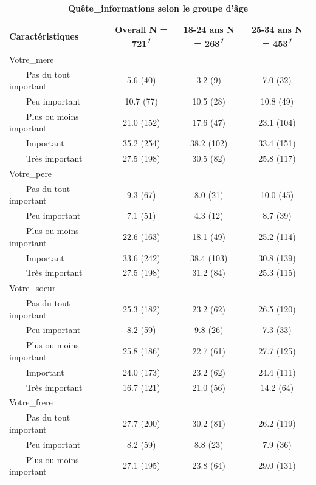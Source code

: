 \documentclass[
]{article}
\begin{document}
\newpage
\begin{table}[!t]
\caption{\label{tab:unnamed-chunk-14}\textbf{Quête\_informations selon le groupe d'âge}} 
\fontsize{12.0pt}{14.4pt}\selectfont
\begin{tabular*}{\linewidth}{@{\extracolsep{\fill}}lccc}
\toprule
\textbf{Caractéristiques} & \textbf{Overall}  N = 721\textsuperscript{\textit{1}} & \textbf{18-24 ans}  N = 268\textsuperscript{\textit{1}} & \textbf{25-34 ans}  N = 453\textsuperscript{\textit{1}} \\ 
\midrule\addlinespace[2.5pt]
Votre\_mere &  &  &  \\ 
    Pas du tout important & 5.6 (40) & 3.2 (9) & 7.0 (32) \\ 
    Peu important & 10.7 (77) & 10.5 (28) & 10.8 (49) \\ 
    Plus ou moins important & 21.0 (152) & 17.6 (47) & 23.1 (104) \\ 
    Important & 35.2 (254) & 38.2 (102) & 33.4 (151) \\ 
    Très important & 27.5 (198) & 30.5 (82) & 25.8 (117) \\ 
Votre\_pere &  &  &  \\ 
    Pas du tout important & 9.3 (67) & 8.0 (21) & 10.0 (45) \\ 
    Peu important & 7.1 (51) & 4.3 (12) & 8.7 (39) \\ 
    Plus ou moins important & 22.6 (163) & 18.1 (49) & 25.2 (114) \\ 
    Important & 33.6 (242) & 38.4 (103) & 30.8 (139) \\ 
    Très important & 27.5 (198) & 31.2 (84) & 25.3 (115) \\ 
Votre\_soeur &  &  &  \\ 
    Pas du tout important & 25.3 (182) & 23.2 (62) & 26.5 (120) \\ 
    Peu important & 8.2 (59) & 9.8 (26) & 7.3 (33) \\ 
    Plus ou moins important & 25.8 (186) & 22.7 (61) & 27.7 (125) \\ 
    Important & 24.0 (173) & 23.2 (62) & 24.4 (111) \\ 
    Très important & 16.7 (121) & 21.0 (56) & 14.2 (64) \\ 
Votre\_frere &  &  &  \\ 
    Pas du tout important & 27.7 (200) & 30.2 (81) & 26.2 (119) \\ 
    Peu important & 8.2 (59) & 8.8 (23) & 7.9 (36) \\ 
    Plus ou moins important & 27.1 (195) & 23.8 (64) & 29.0 (131) \\ 

\end{tabular*}
\end{table}
\end{document}
